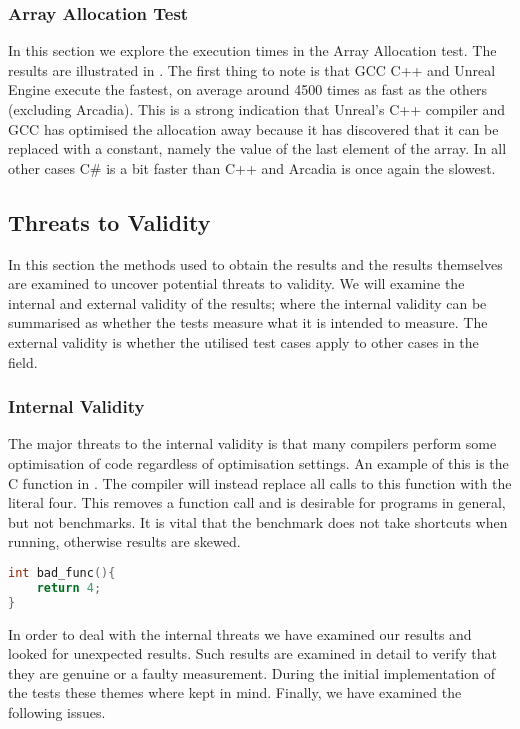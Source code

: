 \subsubsection{Array Allocation Test}
In this section we explore the execution times in the Array Allocation test. The results are illustrated in . The first thing to note is that \ac{GCC} C++ and Unreal Engine execute the fastest, on average around 4500 times as fast as the others (excluding Arcadia). This is a strong indication that Unreal's C++ compiler and \ac{GCC} has optimised the allocation away because it has discovered that it can be replaced with a constant, namely the value of the last element of the array. In all other cases C\# is a bit faster than C++ and Arcadia is once again the slowest. 


\subsection{Threats to Validity} \label{sec:micro:threats}
In this section the methods used to obtain the results and the results themselves are examined to uncover potential threats to validity. We will examine the internal and external validity of the results; where the internal validity can be summarised as whether the tests measure what it is intended to measure. The external validity is whether the utilised test cases apply to other cases in the field.\needcite

\subsubsection{Internal Validity}
The major threats to the internal validity is that many compilers perform some optimisation of code regardless of optimisation settings. An example of this is the C function in . The compiler will instead replace all calls to this function with the literal four. This removes a function call and is desirable for programs in general, but not benchmarks. It is vital that the benchmark does not take shortcuts when running, otherwise results are skewed.

\begin{lstlisting}[language=C,label={lst:bad-c},caption={An example of Function Inlining}]
int bad_func(){
    return 4;
}
\end{lstlisting}

In order to deal with the internal threats we have examined our results and looked for unexpected results. Such results are examined in detail to verify that they are genuine or a faulty measurement. During the initial implementation of the tests these themes where kept in mind. Finally, we have examined the following issues.

